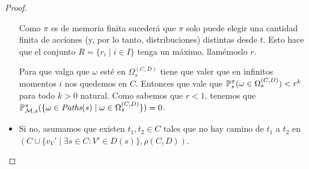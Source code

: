 \begin{proof}
\begin{itemize}
		      Como $\pi$ es de memoria finita sucederá que $\pi$ solo puede elegir una
		      cantidad finita de acciones (y, por lo tanto, distribuciones) distintas desde
		      $t$. Esto hace que el conjunto $R = \{r_i \mid i \in I\}$ tenga un máximo,
		      llamémoslo $r$.

		      Para que valga que $\omega$ esté en $\Omega_s^{(C,D)}$ tiene que valer que en
		      infinitos momentos $i$ nos quedemos en $C$. Entonces que vale que $\mathbb{P}_s^\pi
			      (\omega \in \Omega_s^{(C,D)}) < r^k$ para todo $k > 0$ natural. Como sabemos
		      que $r < 1$, tenemos que $\mathbb{P}^\pi_{\mathcal{M}, s}(\{ \omega \in \textit{Paths}(s) \mid \omega
			      \in \Omega_s^{(C,D)}\}) = 0$.








		\item Si no, asumamos que existen $t_1, t_2 \in C$ tales que no hay camino de $t_1$ a
		      $t_2$ en $(C \cup \{v_V' \mid \exists s \in C : V' \in D(s)\}, \rho(C,D))$.


\end{itemize}
\end{proof}
